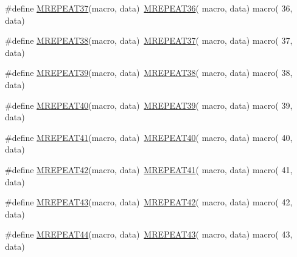\begin{DoxyCompactItemize}
\item 
\#define \mbox{\hyperlink{group__group__sam0__utils__mrepeat_ga82184cd9b81480efe7d23bb1bd035645}{M\+R\+E\+P\+E\+A\+T37}}(macro,  data)~\mbox{\hyperlink{group__group__sam0__utils__mrepeat_gad01671ded2811e1cabe5d5642ebb4987}{M\+R\+E\+P\+E\+A\+T36}}( macro, data)   macro( 36, data)
\item 
\#define \mbox{\hyperlink{group__group__sam0__utils__mrepeat_ga809e564faa3a2869dbe184488e37a7b2}{M\+R\+E\+P\+E\+A\+T38}}(macro,  data)~\mbox{\hyperlink{group__group__sam0__utils__mrepeat_ga82184cd9b81480efe7d23bb1bd035645}{M\+R\+E\+P\+E\+A\+T37}}( macro, data)   macro( 37, data)
\item 
\#define \mbox{\hyperlink{group__group__sam0__utils__mrepeat_ga8940da677b29febf21ca13b7c42d97a2}{M\+R\+E\+P\+E\+A\+T39}}(macro,  data)~\mbox{\hyperlink{group__group__sam0__utils__mrepeat_ga809e564faa3a2869dbe184488e37a7b2}{M\+R\+E\+P\+E\+A\+T38}}( macro, data)   macro( 38, data)
\item 
\#define \mbox{\hyperlink{group__group__sam0__utils__mrepeat_ga38c6ce54b5de528a63b8cb4298e57493}{M\+R\+E\+P\+E\+A\+T40}}(macro,  data)~\mbox{\hyperlink{group__group__sam0__utils__mrepeat_ga8940da677b29febf21ca13b7c42d97a2}{M\+R\+E\+P\+E\+A\+T39}}( macro, data)   macro( 39, data)
\item 
\#define \mbox{\hyperlink{group__group__sam0__utils__mrepeat_ga1c029ee082fe728ca07ac8fb71fbe4d9}{M\+R\+E\+P\+E\+A\+T41}}(macro,  data)~\mbox{\hyperlink{group__group__sam0__utils__mrepeat_ga38c6ce54b5de528a63b8cb4298e57493}{M\+R\+E\+P\+E\+A\+T40}}( macro, data)   macro( 40, data)
\item 
\#define \mbox{\hyperlink{group__group__sam0__utils__mrepeat_gab6109bc5321c78307694174520c00217}{M\+R\+E\+P\+E\+A\+T42}}(macro,  data)~\mbox{\hyperlink{group__group__sam0__utils__mrepeat_ga1c029ee082fe728ca07ac8fb71fbe4d9}{M\+R\+E\+P\+E\+A\+T41}}( macro, data)   macro( 41, data)
\item 
\#define \mbox{\hyperlink{group__group__sam0__utils__mrepeat_ga1e33b119c4bd161e0262399c67ccc6c8}{M\+R\+E\+P\+E\+A\+T43}}(macro,  data)~\mbox{\hyperlink{group__group__sam0__utils__mrepeat_gab6109bc5321c78307694174520c00217}{M\+R\+E\+P\+E\+A\+T42}}( macro, data)   macro( 42, data)
\item 
\#define \mbox{\hyperlink{group__group__sam0__utils__mrepeat_ga2b24fe07a9548203e922430255d5dba1}{M\+R\+E\+P\+E\+A\+T44}}(macro,  data)~\mbox{\hyperlink{group__group__sam0__utils__mrepeat_ga1e33b119c4bd161e0262399c67ccc6c8}{M\+R\+E\+P\+E\+A\+T43}}( macro, data)   macro( 43, data)

\end{DoxyCompactItemize}

